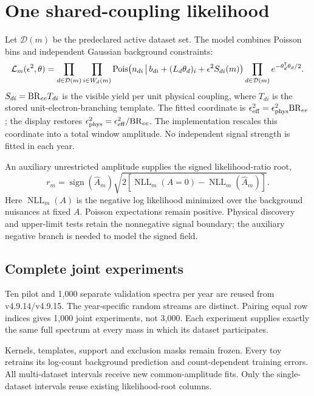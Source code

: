 \documentclass[11pt]{article}
\begin{document}
\clearpage

\clearpage


\clearpage


\clearpage

\clearpage
\section{One shared-coupling likelihood}
Let $\mathcal D(m)$ be the predeclared active dataset set. The model combines Poisson bins and independent Gaussian background constraints:
\[
 \mathcal L_m(\epsilon^2,\theta)=
 \prod_{d\in\mathcal D(m)}\prod_{i\in W_d(m)}
 {\rm Pois}\!\left(n_{di}\,\middle|\,b_{di}+(L_d\theta_d)_i+
                   \epsilon^2 S_{di}(m)\right)
 \prod_{d\in\mathcal D(m)} e^{-\theta_d^{\mathsf T}\theta_d/2}.
\]
$S_{di}={\rm BR}_{ee}T_{di}$ is the visible yield per unit physical coupling, where $T_{di}$ is the stored unit-electron-branching template. The fitted coordinate is $\epsilon_{\rm eff}^2=\epsilon_{\rm phys}^2{\rm BR}_{ee}$; the display restores $\epsilon_{\rm phys}^2=\epsilon_{\rm eff}^2/{\rm BR}_{ee}$. The implementation rescales this coordinate into a total window amplitude. No independent signal strength is fitted in each year.

An auxiliary unrestricted amplitude supplies the signed likelihood-ratio root,
\[
 r_m=\operatorname{sign}(\widehat A_m)
 \sqrt{2\left[\operatorname{NLL}_m(A=0)-\operatorname{NLL}_m(\widehat A_m)\right]}.
\]
Here $\operatorname{NLL}_m(A)$ is the negative log likelihood minimized over the background nuisances at fixed $A$. Poisson expectations remain positive. Physical discovery and upper-limit tests retain the nonnegative signal boundary; the auxiliary negative branch is needed to model the signed field.

\subsection*{Complete joint experiments}
Ten pilot and 1,000 separate validation spectra per year are reused from v4.9.14/v4.9.15. The year-specific random streams are distinct. Pairing equal row indices gives 1,000 joint experiments, not 3,000. Each experiment supplies exactly the same full spectrum at every mass in which its dataset participates.

Kernels, templates, support and exclusion masks remain frozen. Every toy retrains its log-count background prediction and count-dependent training errors. All multi-dataset intervals receive new common-amplitude fits. Only the single-dataset intervals reuse existing likelihood-root columns.
\end{document}
